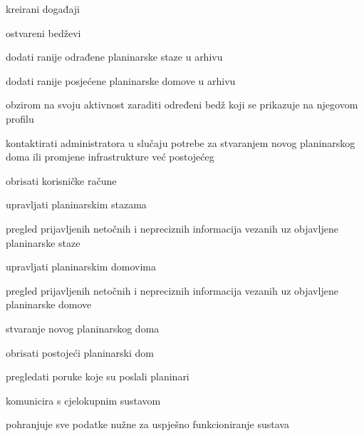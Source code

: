 \begin{packed_enum}
\begin{packed_enum}
\begin{packed_enum}
							\item  kreirani događaji
							\item  ostvareni bedževi
							
						\end{packed_enum}
					\item dodati ranije odrađene planinarske staze u arhivu
					\item dodati ranije posjećene planinarske domove u arhivu
					\item obzirom na svoju aktivnost zaraditi određeni bedž koji se prikazuje na njegovom profilu
					\item kontaktirati administratora u slučaju potrebe za stvaranjem novog planinarskog doma ili promjene infrastrukture već postojećeg
				\end{packed_enum}
			
				\item  {}
				
				\begin{packed_enum}
					
					\item obrisati korisničke račune
			
					\item upravljati planinarskim stazama
						\begin{packed_enum}
							\item pregled prijavljenih netočnih i nepreciznih informacija vezanih uz objavljene planinarske staze

						\end{packed_enum}	
					\item upravljati planinarskim domovima
					\begin{packed_enum}
						\item pregled prijavljenih netočnih i nepreciznih informacija vezanih uz objavljene planinarske domove
						\item stvaranje novog planinarskog doma
						\item obrisati postojeći planinarski dom
					\end{packed_enum}
					\item pregledati poruke koje su poslali planinari
					
				\end{packed_enum}
	
				\item  \underbar{Baza podataka (sudionik):}
				
					\begin{packed_enum}
						
						\item komunicira s cjelokupnim sustavom
						\item pohranjuje sve podatke nužne za uspješno funkcioniranje sustava
						
					\end{packed_enum}
			\end{packed_enum}
			
